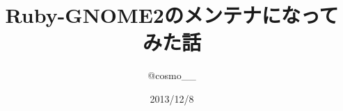 \documentclass[18pt,compress,dvipdfm]{beamer}
\begin{document}
\title{Ruby-GNOME2のメンテナになってみた話}
\author{@cosmo\_\_}
\date{2013/12/8}
\maketitle











\end{document}
